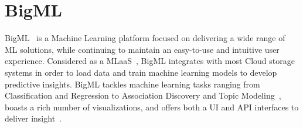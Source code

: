 \section{BigML}

BigML~\cite{hid-sp18-504-cloudacad-bigml} is a Machine Learning platform
focused on delivering a wide range of ML solutions, while continuing to 
maintain an easy-to-use and intuitive user experience. Considered as 
a MLaaS~\cite{hid-sp18-504-cloudacad-bigml}, BigML integrates with most 
Cloud storage systems in order to load data and train machine learning 
models to develop predictive insights. BigML tackles machine learning tasks 
ranging from Classification and Regression to Association Discovery and 
Topic Modeling~\cite{hid-sp18-504-bigml}, boasts a rich number of 
visualizations, and offers both a UI and API interfaces to deliver 
insight~\cite{hid-sp18-504-cloudacad-bigml}.
